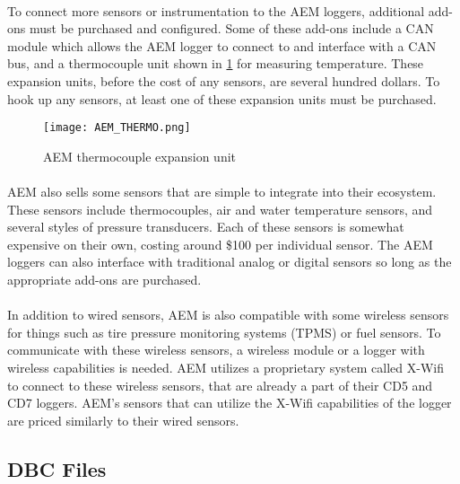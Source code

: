 \paragraph{}
To connect more sensors or instrumentation to the AEM loggers, additional add-ons must be purchased and configured.
Some of these add-ons include a CAN module which allows the AEM logger to connect to and interface with a CAN bus, and a thermocouple unit shown in \cref{fig:AEM_THERMO} for measuring temperature.
These expansion units, before the cost of any sensors, are several hundred dollars.
To hook up any sensors, at least one of these expansion units must be purchased.

\begin{figure}[H]
	\centering
	\texttt{[image: AEM\_THERMO.png]}
	\caption{AEM thermocouple expansion unit}
	\label{fig:AEM_THERMO}
\end{figure}

\paragraph{}
AEM also sells some sensors that are simple to integrate into their ecosystem.
These sensors include thermocouples, air and water temperature sensors, and several styles of pressure transducers.
Each of these sensors is somewhat expensive on their own, costing around \$100 per individual sensor.
The AEM loggers can also interface with traditional analog or digital sensors so long as the appropriate add-ons are purchased.

\paragraph{}
In addition to wired sensors, AEM is also compatible with some wireless sensors for things such as tire pressure monitoring systems (TPMS) or fuel sensors.
To communicate with these wireless sensors, a wireless module or a logger with wireless capabilities is needed.
AEM utilizes a proprietary system called X-Wifi to connect to these wireless sensors, that are already a part of their CD5 and CD7 loggers.
AEM's sensors that can utilize the X-Wifi capabilities of the logger are priced similarly to their wired sensors.

\subsection{DBC Files}

